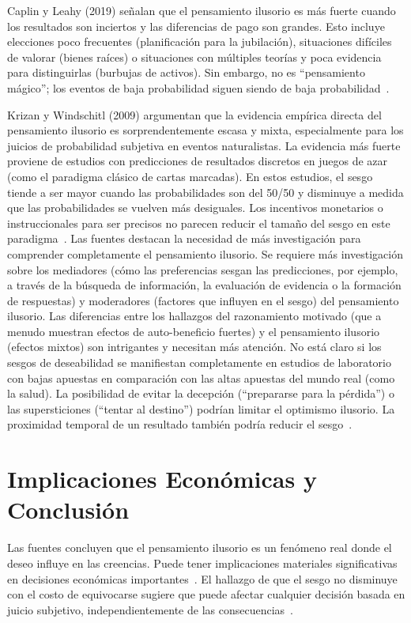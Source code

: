\documentclass[12pt, a4paper, twoside]{article}
\begin{document}
Caplin y Leahy (2019) señalan que el pensamiento ilusorio es más fuerte cuando los resultados son inciertos y las diferencias de pago son grandes. Esto 
incluye elecciones poco frecuentes (planificación para la jubilación), situaciones difíciles de valorar (bienes raíces) o situaciones con múltiples teorías 
y poca evidencia para distinguirlas (burbujas de activos). Sin embargo, no es ``pensamiento mágico''; los eventos de baja probabilidad siguen siendo de baja 
probabilidad~\cite{caplin2019wishful}.

Krizan y Windschitl (2009) argumentan que la evidencia empírica directa del pensamiento ilusorio es sorprendentemente escasa y mixta, especialmente para 
los juicios de probabilidad subjetiva en eventos naturalistas. La evidencia más fuerte proviene de estudios con predicciones de resultados discretos en 
juegos de azar (como el paradigma clásico de cartas marcadas). En estos estudios, el sesgo tiende a ser mayor cuando las probabilidades son del 50/50 y 
disminuye a medida que las probabilidades se vuelven más desiguales. Los incentivos monetarios o instruccionales para ser precisos no parecen reducir el 
tamaño del sesgo en este paradigma~\cite{krizan2009wishful}.
Las fuentes destacan la necesidad de más investigación para comprender completamente el pensamiento ilusorio. Se requiere más investigación sobre los 
mediadores (cómo las preferencias sesgan las predicciones, por ejemplo, a través de la búsqueda de información, la evaluación de evidencia o la formación 
de respuestas) y moderadores (factores que influyen en el sesgo) del pensamiento ilusorio. Las diferencias entre los hallazgos del razonamiento motivado 
(que a menudo muestran efectos de auto-beneficio fuertes) y el pensamiento ilusorio (efectos mixtos) son intrigantes y necesitan más atención. 
No está claro si los sesgos de deseabilidad se manifiestan completamente en estudios de laboratorio con bajas apuestas en comparación con las altas apuestas 
del mundo real (como la salud). La posibilidad de evitar la decepción (``prepararse para la pérdida'') o las supersticiones (``tentar al destino'') podrían 
limitar el optimismo ilusorio. La proximidad temporal de un resultado también podría reducir el sesgo~\cite{krizan2009wishful}.

\section{Implicaciones Económicas y Conclusión}

Las fuentes concluyen que el pensamiento ilusorio es un fenómeno real donde el deseo influye en las creencias. Puede tener implicaciones materiales 
significativas en decisiones económicas importantes~\cite{mayraz2011wishful}. El hallazgo de que el sesgo no disminuye con el costo de equivocarse sugiere que puede afectar 
cualquier decisión basada en juicio subjetivo, independientemente de las consecuencias~\cite{mayraz2011wishful}.
\end{document}
